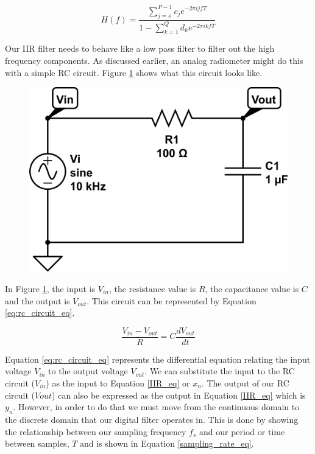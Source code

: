 \begin{equation}\label{Fourier_IIR}
H(f)=\frac{\displaystyle\sum\limits_{j=o}^{P-1} c_je^{-2\pi ijfT}}{1-\displaystyle\sum\limits_{k=1}^{Q} d_ke^{-2\pi ikfT}}
\end{equation}

Our IIR filter needs to behave like a low pass filter to filter out the high frequency components.  As discussed earlier, an analog radiometer might do this with a simple RC circuit.  Figure \ref{rc_circuit} shows what this circuit looks like.

{\begin{figure}[h!tb] 
\centering
\includegraphics[width=17cm]{Images/rc-circuit.png}
\label{rc_circuit}
\end{figure}
}

In Figure \ref{rc_circuit}, the input is $V_{in}$, the resistance value is $R$, the capacitance value is $C$ and the output is $V_{out}$.  This circuit can be represented by Equation \ref{eq:rc_circuit_eq}.

\begin{equation}\label{eq:rc_circuit_eq}
\frac{V_{in}-V_{out}}{R}=C\frac{dV_{out}}{dt}
\end{equation}

Equation \ref{eq:rc_circuit_eq} represents the differential equation relating the input voltage $V_{in}$ to the output voltage $V_{out}$.  We can substitute the input to the RC circuit ($V_{in}$) as the input to Equation \ref{IIR_eq} or $x_n$.  The output of our RC circuit ($V{out}$) can also be expressed as the output in Equation \ref{IIR_eq} which is $y_n$.  However, in order to do that we must move from the continuous domain to the discrete domain that our digital filter operates in.  This is done by showing the relationship between our sampling frequency $f_s$ and our period or time between samples, $T$ and is shown in Equation \ref{sampling_rate_eq}.

